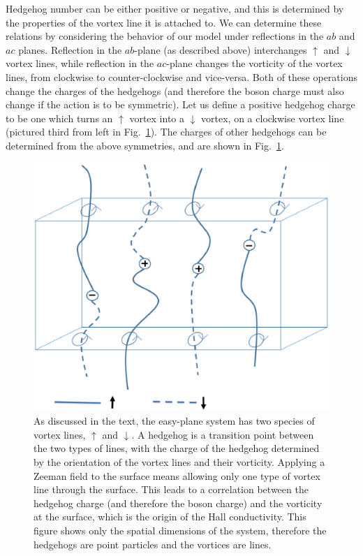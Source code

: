 \documentclass[prb,twocolumn]{revtex4-1}
\begin{document}
Hedgehog number can be either positive or negative, and this is determined by the properties of the vortex line it is attached to. 
We can determine these relations by considering the behavior of our model under reflections in the $ab$ and $ac$ planes. 
Reflection in the $ab$-plane (as described above) interchanges $\uparrow$ and $\downarrow$ vortex lines, while reflection in the $ac$-plane changes the vorticity of the vortex lines, from clockwise to counter-clockwise and vice-versa. Both of these operations change the charges of the hedgehogs (and therefore the boson charge must also change if the action is to be symmetric).
Let us define a positive hedgehog charge to be one which turns an $\uparrow$ vortex into a $\downarrow$ vortex, on a clockwise vortex line (pictured third from left in Fig.~\ref{monopoles}). The charges of other hedgehogs can be determined from the above symmetries, and are shown in Fig.~\ref{monopoles}. 

\begin{figure}
\includegraphics[angle=-90,width=0.95\linewidth]{figures/monopoles.eps}
\caption{As discussed in the text, the easy-plane system has two species of vortex lines, $\uparrow$ and $\downarrow$. A hedgehog is a transition point between the two types of lines, with the charge of the hedgehog determined by the orientation of the vortex lines and their vorticity. Applying a Zeeman field to the surface means allowing only one type of vortex line through the surface. This leads to a correlation between the hedgehog charge (and therefore the boson charge) and the vorticity at the surface, which is the origin of the Hall conductivity. This figure shows only the spatial dimensions of the system, therefore the hedgehogs are point particles and the vortices are lines.}
\label{monopoles}
\end{figure}
\end{document}
